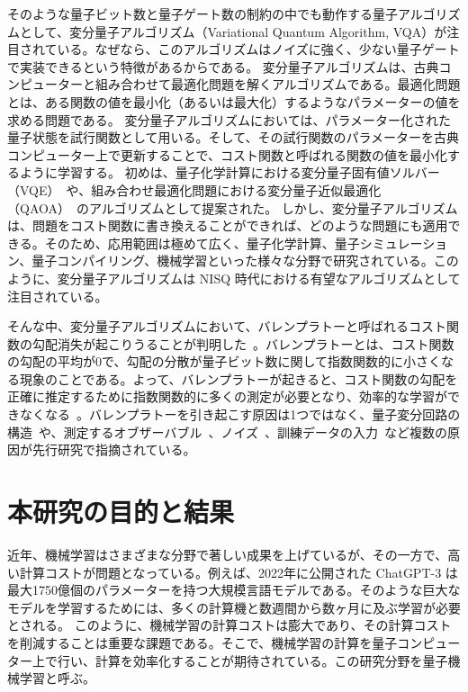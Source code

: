 そのような量子ビット数と量子ゲート数の制約の中でも動作する量子アルゴリズムとして、変分量子アルゴリズム（Variational Quantum Algorithm, VQA）\cite{cerezo2021variational}が注目されている。なぜなら、このアルゴリズムはノイズに強く、少ない量子ゲートで実装できるという特徴があるからである。
変分量子アルゴリズムは、古典コンピューターと組み合わせて最適化問題を解くアルゴリズムである。最適化問題とは、ある関数の値を最小化（あるいは最大化）するようなパラメーターの値を求める問題である。
変分量子アルゴリズムにおいては、パラメーター化された量子状態を試行関数として用いる。そして、その試行関数のパラメーターを古典コンピューター上で更新することで、コスト関数と呼ばれる関数の値を最小化するように学習する。
初めは、量子化学計算における変分量子固有値ソルバー（VQE）~\cite{peruzzo2014variational}や、組み合わせ最適化問題における変分量子近似最適化（QAOA）~\cite{farhi2014quantum}のアルゴリズムとして提案された。
しかし、変分量子アルゴリズムは、問題をコスト関数に書き換えることができれば、どのような問題にも適用できる。そのため、応用範囲は極めて広く、量子化学計算\cite{peruzzo2014variational,mcardle2019variational,yuan2019theory}、量子シミュレーション\cite{georgescu2014quantum,banuls2020simulating}、量子コンパイリング\cite{khatri2019quantum-assisted,sharma2020noise}、機械学習\cite{mitarai2018quantum,farhi2018classification,havlicek2019supervised,schuld2019quantum}といった様々な分野で研究されている。このように、変分量子アルゴリズムは NISQ 時代における有望なアルゴリズムとして注目されている。

そんな中、変分量子アルゴリズムにおいて、バレンプラトーと呼ばれるコスト関数の勾配消失が起こりうることが判明した~\cite{mcclean2018barren}。バレンプラトーとは、コスト関数の勾配の平均が0で、勾配の分散が量子ビット数に関して指数関数的に小さくなる現象のことである。よって、バレンプラトーが起きると、コスト関数の勾配を正確に推定するために指数関数的に多くの測定が必要となり、効率的な学習ができなくなる~\cite{arrasmith2021effect}。バレンプラトーを引き起こす原因は1つではなく、量子変分回路の構造~\cite{mcclean2018barren,marrero2021entanglement,holmes2022connecting}や、測定するオブザーバブル~\cite{cerezo2021cost}、ノイズ~\cite{wang2021noiseinduced}、訓練データの入力~\cite{thanasilp2021subtleties,thanasilp2022exponential}など複数の原因が先行研究で指摘されている。

\section{本研究の目的と結果}
近年、機械学習はさまざまな分野で著しい成果を上げているが、その一方で、高い計算コストが問題となっている。例えば、2022年に公開された ChatGPT-3 は最大1750億個のパラメーターを持つ大規模言語モデルである。そのような巨大なモデルを学習するためには、多くの計算機と数週間から数ヶ月に及ぶ学習が必要とされる。
このように、機械学習の計算コストは膨大であり、その計算コストを削減することは重要な課題である。そこで、機械学習の計算を量子コンピューター上で行い、計算を効率化することが期待されている。この研究分野を量子機械学習\cite{biamonte2017quantum}と呼ぶ。

